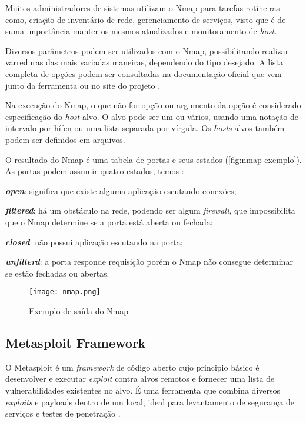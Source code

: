  Muitos administradores de sistemas utilizam o Nmap para tarefas rotineiras como, criação de inventário de rede, gerenciamento de serviços, visto que é de suma importância manter os mesmos atualizados e monitoramento de \textit{host}.

 Diversos parâmetros podem ser utilizados com o Nmap, possibilitando realizar varreduras das mais variadas maneiras, dependendo do tipo desejado. A lista completa de opções podem ser consultadas na documentação oficial que vem junto da ferramenta ou no site do projeto \cite{nmap}. 

 Na execução do Nmap, o que não for opção ou argumento da opção é considerado especificação do \textit{host} alvo. O alvo pode ser um ou vários, usando uma notação de intervalo por hífen ou uma lista separada por vírgula. Os \textit{hosts} alvos também podem ser definidos em arquivos.

O resultado do Nmap é uma tabela de portas e seus estados (\autoref{fig:nmap-exemplo}). As portas podem assumir quatro estados, temos \cite{nmap}: 
\begin{alineas}
\item \textbf{\textit{open}}: significa que existe alguma aplicação escutando conexões; 
\item \textbf{\textit{filtered}}: há um obstáculo na rede, podendo ser algum \textit{firewall}, que impossibilita que o Nmap determine se a porta está aberta ou fechada; 
\item \textbf{\textit{closed}}: não possui aplicação escutando na porta; 
\item \textbf{\textit{unfilterd}}: a porta responde requisição porém o Nmap não consegue determinar se estão fechadas ou abertas.
\end{alineas}

 \begin{figure}[htb]
  \centering
  \caption{Exemplo de saída do Nmap}
  \texttt{[image: nmap.png]}
  \label{fig:nmap-exemplo}
 \end{figure}

\subsection{Metasploit Framework} \label{sec:metasploit}

O Metasploit é um \textit{framework} de código aberto cujo principio básico é desenvolver e executar \textit{exploit} contra alvos remotos e fornecer uma lista de vulnerabilidades existentes no alvo. É uma ferramenta que combina diversos \textit{exploits} e payloads dentro de um local, ideal para levantamento de segurança de serviços e testes de penetração \cite{metasploit:yash}.  

